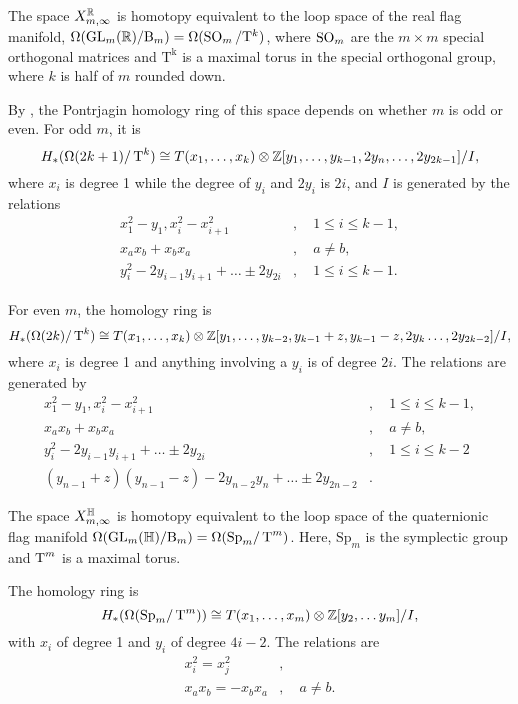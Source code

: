 \begin{theorem}
  The space $X_{m,\infty}^{\mathbb{R}}$ is homotopy equivalent to the loop space
  of the real flag manifold,
  $\Omega(\operatorname{GL}_m(\mathbb{R})/\mathrm{B}_m) = \Omega(\operatorname{SO}_m/\mathrm{T}^{k})$, where
  $\operatorname{SO}_m$ are the $m \times m$ special orthogonal matrices and
  $\mathrm{T^k}$ is a maximal torus in the special orthogonal group,
  where $k$ is half of $m$ rounded down.
  
  By \cite{grbic}, the Pontrjagin homology ring of this space depends
  on whether $m$ is odd or even. For odd $m$, it is
  \[ H_*(\Omega(2k+1)/\operatorname{T}^k) \cong T(x_1,\dots,x_k)\otimes
  \mathbb{Z}[y_1,\dots,y_{k-1},2y_n,\dots,2y_{2k-1}] / I, \]
  where $x_i$ is degree 1 while the degree of $y_i$ and $2y_i$ is
  $2i$, and $I$ is generated by the relations
  \begin{align*}
    x_1^2-y_1, x_i^2-x_{i+1}^2&,\quad 1 \leq i \leq k-1, \\
    x_a x_b + x_b x_a&,\quad a \neq b, \\
    y_i^2-2y_{i-1}y_{i+1}+\dots\pm 2y_{2i}&,\quad 1 \leq i \leq k-1.
  \end{align*}

  For even $m$, the homology ring is
  \[ H_*(\Omega(2k)/\operatorname{T}^k) \cong T(x_1,\dots,x_k)\otimes
  \mathbb{Z}[y_1,\dots,y_{k-2},y_{k-1}+z,y_{k-1}-z,2y_k\dots,2y_{2k-2}] /
  I, \]
  where $x_i$ is degree 1 and anything involving a $y_i$ is of degree
  $2i$. The relations are generated by
  \begin{align*}
    x_1^2-y_1, x_i^2-x_{i+1}^2&, \quad 1 \leq i \leq k-1, \\
    x_ax_b+x_bx_a&, \quad a\neq b, \\
    y_i^2-2y_{i-1}y_{i+1}+\dots\pm 2y_{2i}&,\quad 1 \leq i \leq k-2 \\
    (y_{n-1}+z)(y_{n-1}-z)-2y_{n-2}y_n+\dots\pm 2y_{2n-2}&. 
  \end{align*}
\end{theorem}

\begin{theorem}
  The space $X_{m,\infty}^{\mathbb{H}}$ is homotopy equivalent to the loop
  space of the quaternionic flag manifold
  $\Omega(\operatorname{GL}_m(\mathbb{H})/\mathrm{B}_m) = \Omega(\mathrm{Sp}_m/\operatorname{T}^m)$.
  Here, $\mathrm{Sp}_m$ is the symplectic group and $\operatorname{T}^m$ is a
  maximal torus.

  The homology ring is
  \[ H_*(\Omega(\mathrm{Sp}_m/\operatorname{T}^m)) \cong T(x_1,\dots,x_m)\otimes
  \mathbb{Z}[y_2,\dots y_m] / I, \]
  with $x_i$ of degree 1 and $y_i$ of degree $4i-2$. The relations are
  \begin{align*}
    x_i^2 = x_j^2&,\\
    x_a x_b = -x_b x_a&, \quad a\neq b.
  \end{align*}
\end{theorem}

